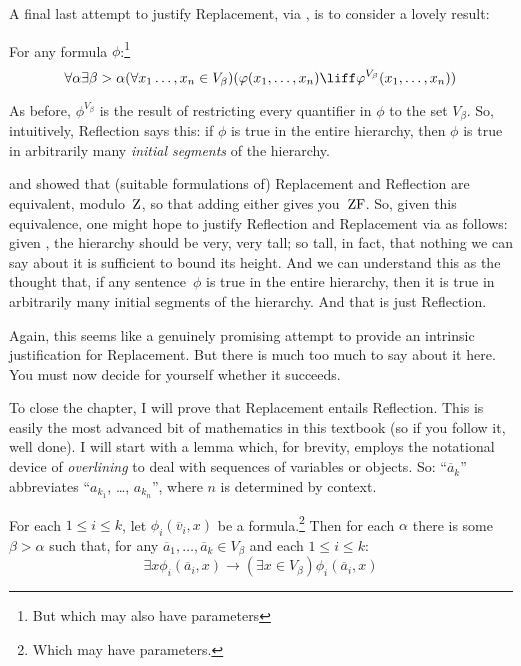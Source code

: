 \documentclass[../../../include/open-logic-section]{subfiles}
\begin{document}

A final last attempt to justify Replacement, via \stagesinex, is to
consider a lovely result:
\begin{thm}
For any formula $\phi$:\footnote{But which may also have parameters}
\[
\forall \alpha \exists \beta > \alpha (\forall x_1 \ldots, x_n \in
V_\beta)(\phi(x_1, \ldots, x_n) \liff \phi^{V_\beta}(x_1, \ldots, x_n))
\]
\end{thm}

As before, $\phi^{V_\beta}$ is the result of restricting every
quantifier in $\phi$ to the set $V_\beta$. So, intuitively, Reflection
says this: if $\phi$ is true in the entire hierarchy, then $\phi$ is
true in arbitrarily many \emph{initial segments} of the hierarchy. 

\citet{Montague1961} and \citet{Levy1960} showed that (suitable
formulations of) Replacement and Reflection are equivalent,
modulo~$\mathrm{Z}$, so that adding either gives you~$\mathrm{ZF}$. So, given this
equivalence, one might hope to justify Reflection  and Replacement via
\stagesinex{} as follows: given \stagesinex, the hierarchy should be
very, very tall; so tall, in fact, that nothing we can say about it is
sufficient to bound its height. And we can understand this as the
thought that, if any sentence~$\phi$ is true in the entire hierarchy,
then it is true in arbitrarily many initial segments of the hierarchy.
And that is just Reflection. 

Again, this seems like a genuinely promising attempt to provide an
intrinsic justification for Replacement. But there is much too much to
say about it here. You must now decide for yourself whether it
succeeds.

To close the chapter, I will prove that Replacement entails
Reflection. This is easily the most advanced bit of mathematics in
this textbook (so if you follow it, well done). I will start with a
lemma which, for brevity, employs the notational device of
\emph{overlining} to deal with sequences of variables or objects. So:
``$\overline{a}_k$'' abbreviates ``$a_{k_1}$, \dots, $a_{k_n}$'', where
$n$ is determined by context.

\begin{lem}
For each $1 \leq i \leq k$, let $\phi_i(\overline{v}_i, x)$ be a
formula.\footnote{Which may have parameters.} Then for each $\alpha$
there is some $\beta > \alpha$ such that, for any $\overline{a}_1,
\ldots, \overline{a}_k \in V_\beta$ and each $1 \leq i \leq k$:
\[
	\exists x\phi_i(\overline{a}_i, x) \rightarrow (\exists x \in V_\beta) \phi_i(\overline{a}_i, x)
\]
\end{lem}
\end{document}
